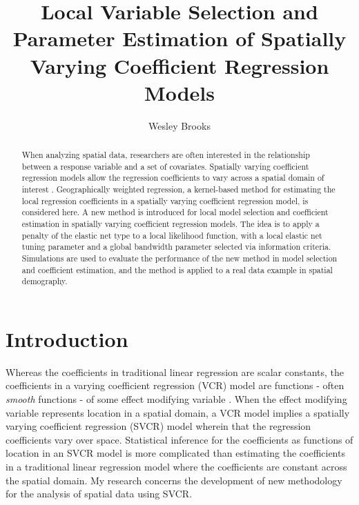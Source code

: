 \documentclass[authoryear, review, 11pt]{elsarticle}
\title{Local Variable Selection and Parameter Estimation of Spatially Varying Coefficient Regression Models}
\author{Wesley Brooks}
\date{}                                           %
\begin{document}
\begin{abstract}
When analyzing spatial data, researchers are often interested in the relationship between a response variable and a set of covariates.  Spatially varying coefficient regression models allow the regression coefficients to vary across a spatial domain of interest . Geographically weighted regression, a kernel-based method for estimating the local regression coefficients in a spatially varying coefficient regression model, is considered here. A new method is introduced for local model selection and coefficient estimation in spatially varying coefficient regression models. The idea is to apply a penalty of the elastic net type to a local likelihood function, with a local elastic net tuning parameter and a global bandwidth parameter selected via information criteria. Simulations are used to evaluate the performance of the new method in model selection and coefficient estimation, and the method is applied to a real data example in spatial demography.
\end{abstract}

\maketitle


\section{Introduction}
	Whereas the coefficients in traditional linear regression are scalar constants, the coefficients in a varying coefficient regression (VCR) model are functions - often \emph{smooth} functions - of some effect modifying variable \citep{Hastie:1993a}. When the effect modifying variable represents location in a spatial domain, a VCR model implies a spatially varying coefficient regression (SVCR) model wherein that the regression coefficients vary over space. Statistical inference for the coefficients as functions of location in an SVCR model is more complicated than estimating the coefficients in a traditional linear regression model where the coefficients are constant across the spatial domain. My research concerns the development of new methodology for the analysis of spatial data using SVCR.
	
\end{document}
